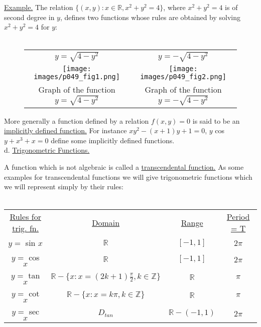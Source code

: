 \documentclass[11pt]{amsbook}
\begin{document}
\underline{Example.} The relation $\{(x,y) : x \in \mathbb{R}, x^2 + y^2 = 4\}$,
where $x^2 + y^2 = 4$ is of second degree in $y$, defines two
functions whose rules are obtained by solving $x^2 + y^2 = 4$
for $y$: \\ \\

\begin{figure}[htb]
\label{fig:fig49}
\begin{tabular}{c c}
$y = \sqrt{4 - y^2}$ & $y = -\sqrt{4 - y^2}$ \\
\texttt{[image: images/p049\_fig1.png]} & \texttt{[image: images/p049\_fig2.png]} \\
Graph of the function  $y = \sqrt{4 - y^2}$ & Graph of the function $y = -\sqrt{4 - y^2}$
\end{tabular}
\end{figure}

More generally a function defined by a relation $f(x, y) = 0$ is said to be an
\underline{implicitly defined function.} For instance $xy^2 - (x+1)y + 1 = 0$, 
$y$ cos $y + x^3 + x = 0$ define some implicitly defined functions. \\

d. \underline{Trigonometric Functions.}

A function which is not algebraic is called a \underline{transcendental function.} 
As some examples for transcendental functions we will give trigonometric functions
which we will represent simply by their rules: \\ \\

\begin{tabular}{c c c c}
\underline{Rules for trig. fn.} & \underline{Domain} & \underline{Range} & \underline{Period = T} \\
$y =$ sin $x$ & $\mathbb{R}$ & $[-1,1]$ & 2$\pi$ \\
$y =$ cos $x$ & $\mathbb{R}$ & $[-1,1]$ & 2$\pi$ \\
$y =$ tan $x$ & $\mathbb{R} - \{x : x = (2k + 1)\frac{\pi}{2}, k \in \mathbb{Z}\}$ & $\mathbb{R}$ & $\pi$ \\
$y =$ cot $x$ & $\mathbb{R} - \{x : x = k\pi, k \in \mathbb{Z}\}$ & $\mathbb{R}$ & $\pi$ \\
$y =$ sec $x$ & $D_{tan}$ & $\mathbb{R} - (-1,1)$ & 2$\pi$ \\
\end{tabular}
\end{document}
